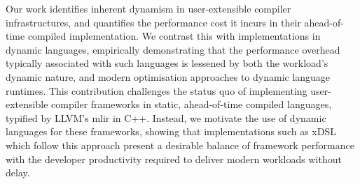Our work identifies inherent dynamism in user-extensible compiler infrastructures, and quantifies the performance cost it incurs in their ahead-of-time compiled implementation.
We contrast this with implementations in dynamic languages, empirically demonstrating that the performance overhead typically associated with such languages is lessened by both the workload's dynamic nature, and modern optimisation approaches to dynamic language runtimes.
This contribution challenges the status quo of implementing user-extensible compiler frameworks in static, ahead-of-time compiled languages, typified by LLVM's \ac{mlir} in C++. Instead, we motivate the use of dynamic languages for these frameworks, showing that implementations such as xDSL which follow this approach present a desirable balance of framework performance with the developer productivity required to deliver modern workloads without delay.
